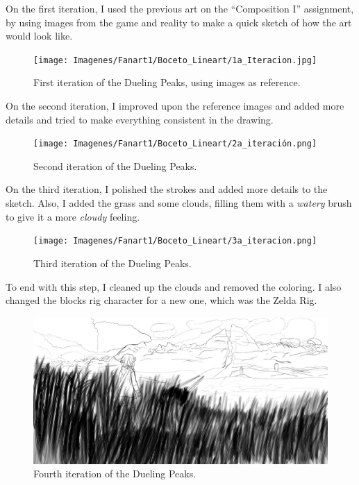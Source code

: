 \documentclass{cup-pan}
\begin{document}
        On the first iteration, I used the previous art on the “Composition I” assignment, by using images from the game and reality to make a quick sketch of how the art would look like.\\
        \begin{figure}[H]
            \texttt{[image: Imagenes/Fanart1/Boceto\_Lineart/1a\_Iteracion.jpg]}
            \caption{First iteration of the Dueling Peaks, using images as reference.}
        \end{figure}

        On the second iteration, I improved upon the reference images and added more details and tried to make everything consistent in the drawing.\\
        \begin{figure}[H]
            \texttt{[image: Imagenes/Fanart1/Boceto\_Lineart/2a\_iteración.png]}
            \caption{Second iteration of the Dueling Peaks.}
        \end{figure}

        On the third iteration, I polished the strokes and added more details to the sketch. Also, I added the grass and some clouds, filling them with a \textit{watery} brush to give it a more \textit{cloudy} feeling.\\
        \begin{figure}[H]
            \texttt{[image: Imagenes/Fanart1/Boceto\_Lineart/3a\_iteracion.png]}
            \caption{Third iteration of the Dueling Peaks.}
        \end{figure}

        To end with this step, I cleaned up the clouds and removed the coloring. I also changed the blocks rig character for a new one, which was the Zelda Rig.\\
        \begin{figure}[H]
            \includegraphics[width=\textwidth]{Imagenes/Fanart1/Boceto_Lineart/4a_Iteracion.png}
            \caption{Fourth iteration of the Dueling Peaks.}
        \end{figure}
\end{document}
